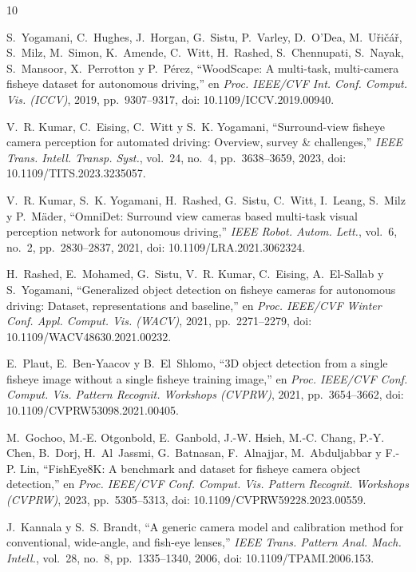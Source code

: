 \documentclass[conference]{IEEEtran}
\begin{document}
\balance
\begin{thebibliography}{10}

S.~Yogamani, C.~Hughes, J.~Horgan, G.~Sistu, P.~Varley, D.~O'Dea, M.~U\v{r}i\v{c}\'a\v{r}, S.~Milz, M.~Simon, K.~Amende, C.~Witt, H.~Rashed, S.~Chennupati, S.~Nayak, S.~Mansoor, X.~Perrotton y P.~Pérez, ``WoodScape: A multi-task, multi-camera fisheye dataset for autonomous driving,'' en \emph{Proc. IEEE/CVF Int. Conf. Comput. Vis. (ICCV)}, 2019, pp.~9307--9317, doi: 10.1109/ICCV.2019.00940.

V.~R. Kumar, C.~Eising, C.~Witt y S.~K. Yogamani, ``Surround-view fisheye camera perception for automated driving: Overview, survey \& challenges,'' \emph{IEEE Trans. Intell. Transp. Syst.}, vol.~24, no.~4, pp.~3638--3659, 2023, doi: 10.1109/TITS.2023.3235057.

V.~R. Kumar, S.~K. Yogamani, H.~Rashed, G.~Sistu, C.~Witt, I.~Leang, S.~Milz y P.~Mäder, ``OmniDet: Surround view cameras based multi-task visual perception network for autonomous driving,'' \emph{IEEE Robot. Autom. Lett.}, vol.~6, no.~2, pp.~2830--2837, 2021, doi: 10.1109/LRA.2021.3062324.

H.~Rashed, E.~Mohamed, G.~Sistu, V.~R. Kumar, C.~Eising, A.~El-Sallab y S.~Yogamani, ``Generalized object detection on fisheye cameras for autonomous driving: Dataset, representations and baseline,'' en \emph{Proc. IEEE/CVF Winter Conf. Appl. Comput. Vis. (WACV)}, 2021, pp.~2271--2279, doi: 10.1109/WACV48630.2021.00232.

E.~Plaut, E.~Ben-Yaacov y B.~El~Shlomo, ``3D object detection from a single fisheye image without a single fisheye training image,'' en \emph{Proc. IEEE/CVF Conf. Comput. Vis. Pattern Recognit. Workshops (CVPRW)}, 2021, pp.~3654--3662, doi: 10.1109/CVPRW53098.2021.00405.

M.~Gochoo, M.-E. Otgonbold, E.~Ganbold, J.-W. Hsieh, M.-C. Chang, P.-Y. Chen, B.~Dorj, H.~Al~Jassmi, G.~Batnasan, F.~Alnajjar, M.~Abduljabbar y F.-P. Lin, ``FishEye8K: A benchmark and dataset for fisheye camera object detection,'' en \emph{Proc. IEEE/CVF Conf. Comput. Vis. Pattern Recognit. Workshops (CVPRW)}, 2023, pp.~5305--5313, doi: 10.1109/CVPRW59228.2023.00559.

J.~Kannala y S.~S. Brandt, ``A generic camera model and calibration method for conventional, wide-angle, and fish-eye lenses,'' \emph{IEEE Trans. Pattern Anal. Mach. Intell.}, vol.~28, no.~8, pp.~1335--1340, 2006, doi: 10.1109/TPAMI.2006.153.


\end{thebibliography}
\end{document}
